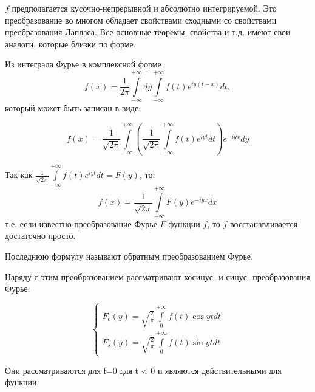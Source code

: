 \documentclass[a4paper, 12pt]{report}
\begin{document}
\(f\) предполагается кусочно-непрерывной и абсолютно интегрируемой.
Это преобразование во многом обладает свойствами сходными со свойствами преобразования Лапласа.
Все основные теоремы, свойства и т.д. имеют свои аналоги, которые близки по форме.

Из интеграла Фурье в комплексной форме
\[
    f(x) = \frac{1}{2\pi}\int\limits_{-\infty}^{+\infty}dy\int\limits_{-\infty}^{+\infty}f(t)e^{iy(t-x)}dt,
\]
который может быть записан в виде:

\[
    f(x) = \frac{1}{\sqrt{2\pi}}\int\limits_{-\infty}^{+\infty}(\frac{1}{\sqrt{2\pi}}\int\limits_{-\infty}^{+\infty}f(t)e^{iyt}dt)e^{-iyx}dy
\]

Так как \(\frac{1}{\sqrt{2\pi}}\int\limits_{-\infty}^{+\infty}f(t)e^{iyt}dt = F(y)\), то:
\[
    f(x) = \frac{1}{\sqrt{2\pi}}\int\limits_{-\infty}^{+\infty}F(y)e^{-iyx}dx
\]
т.е. если известно преобразование Фурье \(F\) функции \(f\), то \(f\) восстанавливается достаточно просто.

Последнюю формулу называют обратным преобразованием Фурье.

Наряду с этим преобразованием рассматривают косинус- и синус- преобразования Фурье:

\[
\begin{cases}
	F_c(y)=\sqrt{\frac{2}{\pi}}\int\limits_{0}^{+\infty}f(t)\cos yt dt \\
	F_s(y)=\sqrt{\frac{2}{\pi}}\int\limits_{0}^{+\infty}f(t)\sin yt dt 
\end{cases}
\]


Они рассматриваются для ƒ=0 для t < 0 и являются действительными для функции
\end{document}
